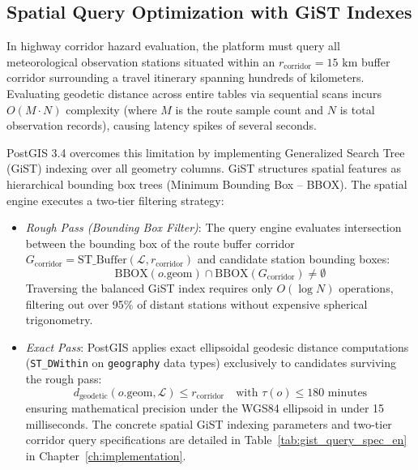 \subsection{Spatial Query Optimization with GiST Indexes}
In highway corridor hazard evaluation, the platform must query all meteorological observation stations situated within an $r_{\text{corridor}} = 15\text{ km}$ buffer corridor surrounding a travel itinerary spanning hundreds of kilometers. Evaluating geodetic distance across entire tables via sequential scans incurs $O(M \cdot N)$ complexity (where $M$ is the route sample count and $N$ is total observation records), causing latency spikes of several seconds.

PostGIS 3.4 overcomes this limitation by implementing Generalized Search Tree (GiST) indexing over all geometry columns. GiST structures spatial features as hierarchical bounding box trees (Minimum Bounding Box -- BBOX). The spatial engine executes a two-tier filtering strategy:
\begin{itemize}
    \item[-] \textit{Rough Pass (Bounding Box Filter)}: The query engine evaluates intersection between the bounding box of the route buffer corridor $G_{\text{corridor}} = \text{ST\_Buffer}(\mathcal{L}, r_{\text{corridor}})$ and candidate station bounding boxes:
    \begin{equation}
    \label{eq:spatial_bbox_filter_en}
    \text{BBOX}(o.\text{geom}) \cap \text{BBOX}(G_{\text{corridor}}) \ne \emptyset
    \end{equation}
    Traversing the balanced GiST index requires only $O(\log N)$ operations, filtering out over 95\% of distant stations without expensive spherical trigonometry.
    \item[-] \textit{Exact Pass}: PostGIS applies exact ellipsoidal geodesic distance computations (\texttt{ST\_DWithin} on \texttt{geography} data types) exclusively to candidates surviving the rough pass:
    \begin{equation}
    \label{eq:spatial_exact_filter_en}
    d_{\text{geodetic}}(o.\text{geom}, \mathcal{L}) \le r_{\text{corridor}} \quad \text{with } \tau(o) \le 180\text{ minutes}
    \end{equation}
    ensuring mathematical precision under the WGS84 ellipsoid in under 15 milliseconds. The concrete spatial GiST indexing parameters and two-tier corridor query specifications are detailed in Table~\ref{tab:gist_query_spec_en} in Chapter~\ref{ch:implementation}.
\end{itemize}

